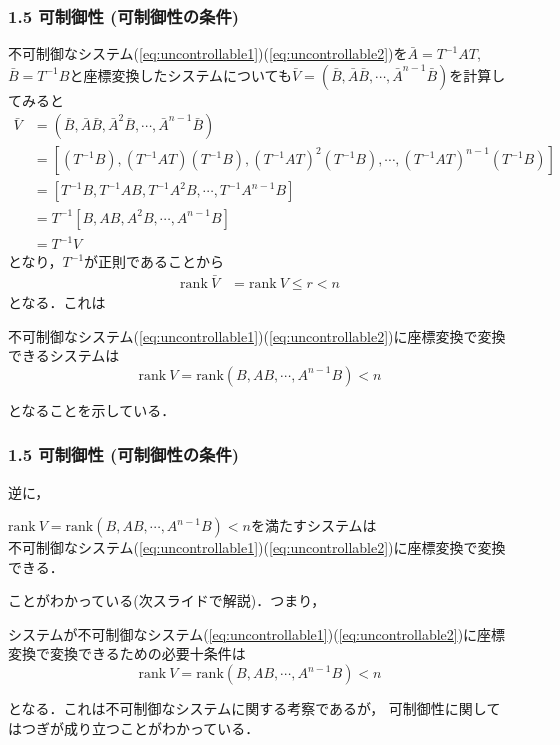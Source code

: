 \documentclass[10pt]{beamer}
\begin{document}
\begin{frame}[t]
\frametitle{1.5 可制御性 (可制御性の条件)}
不可制御なシステム(\ref{eq:uncontrollable1})(\ref{eq:uncontrollable2})を$\bar{A}= T^{-1} A T$, $\bar{B} = T^{-1}B$と座標変換したシステムについても$\bar{V}=(\bar{B},\bar{A}\bar{B},\cdots, \bar{A}^{n-1}\bar{B})$を計算してみると
\begin{align}
 \bar{V}&=(\bar{B},\bar{A}\bar{B},\bar{A}^{2}\bar{B},\cdots, \bar{A}^{n-1}\bar{B})
\nonumber\\
 &= [(T^{-1}B), (T^{-1}AT)(T^{-1}B),(T^{-1}AT)^{2}(T^{-1}B),\cdots,(T^{-1}AT)^{n-1}(T^{-1}B)]
\nonumber \\
 &= [T^{-1}B, T^{-1} AB, T^{-1} A^2 B,\cdots, T^{-1} A^{n-1} B]
\nonumber\\
 &= T^{-1} [B, AB, A^2 B,\cdots, A^{n-1} B]
\nonumber \\
 &= T^{-1} V
\end{align}
となり，$T^{-1}$が正則であることから
\begin{align}
 \mbox{rank}\ \bar{V} & = \mbox{rank}\ {V} \leq r < n
\end{align}
となる．これは
\begin{block}{}
不可制御なシステム(\ref{eq:uncontrollable1})(\ref{eq:uncontrollable2})に座標変換で変換できるシステムは
$$\mbox{rank}\ V = \mbox{rank} (B,AB,\cdots,A^{n-1}B) < n$$
\end{block}
となることを示している．
\end{frame}


\begin{frame}[t]
\frametitle{1.5 可制御性 (可制御性の条件)}
逆に，
\begin{block}{}
$\mbox{rank}\ V = \mbox{rank} (B,AB,\cdots,A^{n-1}B) < n$を満たすシステムは\\
不可制御なシステム(\ref{eq:uncontrollable1})(\ref{eq:uncontrollable2})に座標変換で変換できる．
\end{block}
ことがわかっている(次スライドで解説)．つまり，
\begin{block}{}
システムが不可制御なシステム(\ref{eq:uncontrollable1})(\ref{eq:uncontrollable2})に座標変換で変換できるための必要十条件は
$$\mbox{rank}\ V = \mbox{rank} (B,AB,\cdots,A^{n-1}B) < n$$
\end{block}
となる．これは不可制御なシステムに関する考察であるが，
可制御性に関してはつぎが成り立つことがわかっている．
\end{frame}
\end{document}
